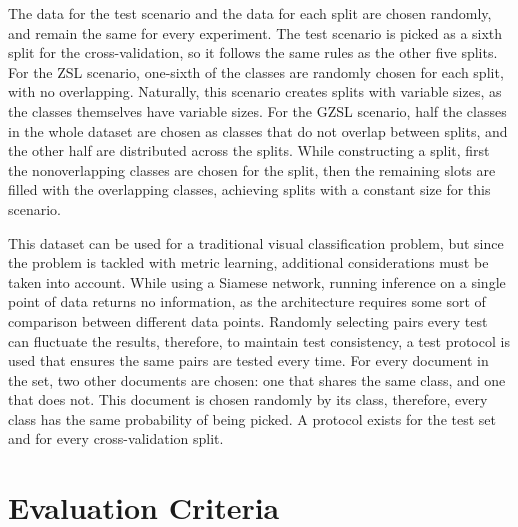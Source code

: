 The data for the test scenario and the data for each split are chosen randomly, and remain the same for every experiment. The test scenario is picked as a sixth split for the cross-validation, so it follows the same rules as the other five splits. For the \gls{ZSL} scenario, one-sixth of the classes are randomly chosen for each split, with no overlapping. Naturally, this scenario creates splits with variable sizes, as the classes themselves have variable sizes. For the \gls{GZSL} scenario, half the classes in the whole dataset are chosen as classes that do not overlap between splits, and the other half are distributed across the splits. While constructing a split, first the nonoverlapping classes are chosen for the split, then the remaining slots are filled with the overlapping classes, achieving splits with a constant size for this scenario.

This dataset can be used for a traditional visual classification problem, but since the problem is tackled with metric learning, additional considerations must be taken into account. While using a Siamese network, running inference on a single point of data returns no information, as the architecture requires some sort of comparison between different data points. Randomly selecting pairs every test can fluctuate the results, therefore, to maintain test consistency, a test protocol is used that ensures the same pairs are tested every time. For every document in the set, two other documents are chosen: one that shares the same class, and one that does not. This document is chosen randomly by its class, therefore, every class has the same probability of being picked. A protocol exists for the test set and for every cross-validation split.


\section{Evaluation Criteria}
\label{sec:evaluation}

